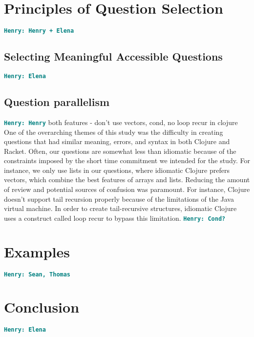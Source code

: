 \documentclass[12pt]{article}
\newcommand{\comment}[1]{{\bf \tt  {#1}}}
\newcommand{\hfcomment}[1]{\textcolor{Teal}{\comment{Henry: {#1}}}}
\begin{document}
	
	

\section{Principles of Question Selection}\label{sec:select}
	\hfcomment{Henry + Elena}
	\subsection{Selecting Meaningful Accessible Questions}\label{sec:meaning}
	\hfcomment{Elena}
	\subsection{Question parallelism}\label{sec:parallel}
	\hfcomment{Henry}
	both features - don't use vectors, cond, no loop recur in clojure
	One of the overarching themes of this study was the difficulty in creating questions that had similar meaning, errors, and syntax in both Clojure and Racket.
	 Often, our questions are somewhat less than idiomatic because of the constraints imposed by the short time commitment we intended for the study.
	  For instance, we only use lists in our questions, where idiomatic Clojure prefers vectors, which combine the best features of arrays and lists.
	   Reducing the amount of review and potential sources of confusion was paramount. 
	   For instance, Clojure doesn't support tail recursion properly because of the limitations of the Java virtual machine.
	    In order to create tail-recursive structures, idiomatic Clojure uses a construct called loop recur to bypass this limitation. \hfcomment{Cond?}
\section{Examples}\label{sec:examples}
	\hfcomment{Sean, Thomas}

\section{Conclusion}\label{sec:conclusion}
	\hfcomment{Elena}




\end{document}
